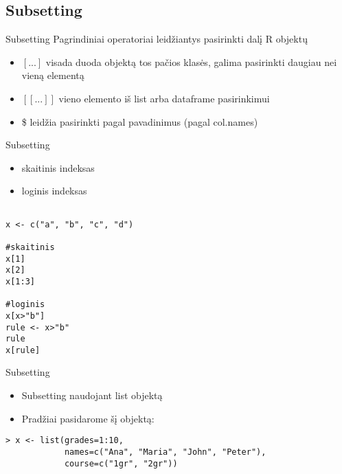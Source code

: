 \documentclass[11pt,xcolor=table]{beamer}
\begin{document}
\subsection{Subsetting}
\begin{frame}[fragile]{Subsetting}
Pagrindiniai operatoriai leidžiantys pasirinkti dalį R objektų
\begin{itemize}
\item $[...]$ visada duoda objektą tos pačios klasės, galima pasirinkti daugiau nei vieną elementą
\item $[[...]]$ vieno elemento iš list arba dataframe pasirinkimui
\item \$ leidžia pasirinkti pagal pavadinimus (pagal col.names)
\end{itemize}
\end{frame}

\begin{frame}[fragile]{Subsetting}
\begin{itemize}
\item skaitinis indeksas
\item loginis indeksas
\end{itemize}
\begin{lstlisting}

x <- c("a", "b", "c", "d")

#skaitinis
x[1]
x[2]
x[1:3]

#loginis
x[x>"b"]
rule <- x>"b"
rule
x[rule]
\end{lstlisting}
\end{frame}

\begin{frame}[fragile]{Subsetting}
\begin{itemize}
\item Subsetting naudojant list objektą
\item Pradžiai pasidarome šį objektą:
\end{itemize}
\begin{lstlisting}
> x <- list(grades=1:10, 
			names=c("Ana", "Maria", "John", "Peter"),
			course=c("1gr", "2gr"))

\end{lstlisting}
\end{frame}
\end{document}
